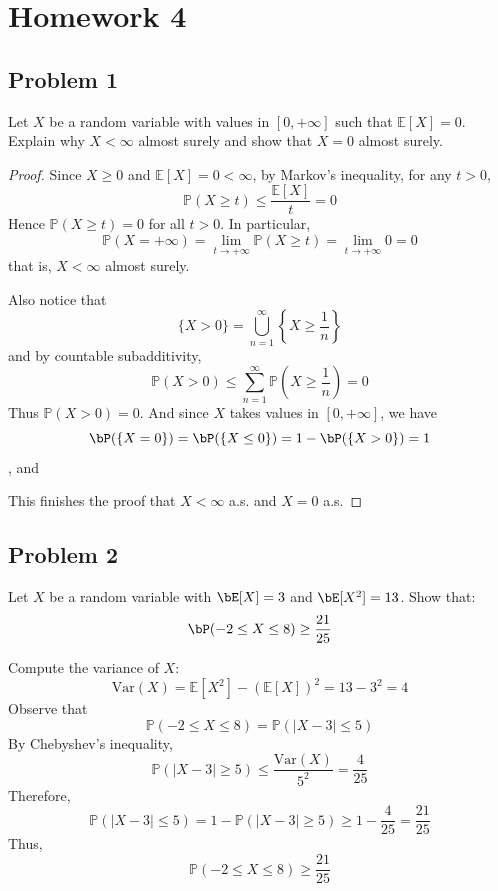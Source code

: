 \chapter*{Homework 4}
\section*{Problem 1}
Let $X$ be a random variable with values in $[0,+\infty]$ 
such that $\mathbb{E}[X]=0$. 
Explain why $X<\infty$ almost surely and show that $X=0$ almost surely.

\begin{proof}

Since $X \ge 0$ and $\mathbb{E}[X]=0<\infty$, by Markov's inequality, for any $t>0$,
\[
\mathbb{P}(X \ge t) \le \frac{\mathbb{E}[X]}{t} = 0
\]
Hence $\mathbb{P}(X \ge t)=0$ for all $t>0$. In particular,
\[
\mathbb{P}(X = +\infty) = \lim_{t \to +\infty} \mathbb{P}(X \ge t) =  \lim_{t \to +\infty} 0 = 0
\]
that is, $X<\infty$ almost surely.


Also notice that
\[
\{X>0\} = \bigcup_{n=1}^\infty \left\{X \ge \frac{1}{n}\right\}
\]
and by countable subadditivity,
\[
\mathbb{P}(X>0) \le \sum_{n=1}^\infty \mathbb{P}\left(X \ge \frac{1}{n}\right) = 0
\]
Thus $\mathbb{P}(X>0)=0$.
And since $X$ takes values in $[0,+\infty]$,
 we have $$\bP(\{X=0\}) = \bP(\{X \le 0\}) = 1 - \bP(\{X>0\}) = 1$$, and

This finishes the proof that $X<\infty$ a.s. and $X=0$ a.s.
\end{proof}


\section*{Problem 2}
Let $X$ be a random variable with $\bE[X] = 3$ 
and $\bE[X^2] = 13$. Show that:
$$ 
\bP(-2\leq X \leq 8) \geq \frac{21}{25}
 $$   
\begin{solution}
    
Compute the variance of $X$:
\[
\mathrm{Var}(X) = \mathbb{E}[X^2] - (\mathbb{E}[X])^2 = 13 - 3^2 = 4
\]
Observe that
\[
\mathbb{P}(-2 \le X \le 8) = \mathbb{P}(|X-3| \le 5)
\]
By Chebyshev's inequality,
\[
\mathbb{P}(|X-3| \ge 5) \le \frac{\mathrm{Var}(X)}{5^2} = \frac{4}{25}
\]
Therefore,
\[
\mathbb{P}(|X-3| \le 5) = 1 - \mathbb{P}(|X-3| \ge 5) \ge 1 - \frac{4}{25} = \frac{21}{25}
\]
Thus,
\[
\mathbb{P}(-2 \le X \le 8) \ge \frac{21}{25}
\]
\end{solution}

